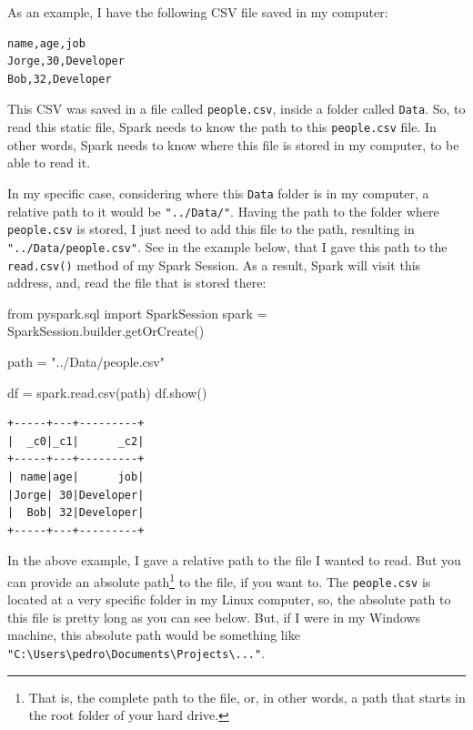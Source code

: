\documentclass[
  11pt,
  letterpaper,
  DIV=11,
  numbers=noendperiod]{scrreprt}
\newenvironment{Shaded}{\begin{snugshade}}{\end{snugshade}}
\newcommand{\ImportTok}[1]{\textcolor[rgb]{0.00,0.46,0.62}{#1}}
\newcommand{\NormalTok}[1]{\textcolor[rgb]{0.00,0.23,0.31}{#1}}
\newcommand{\OperatorTok}[1]{\textcolor[rgb]{0.37,0.37,0.37}{#1}}
\newcommand{\StringTok}[1]{\textcolor[rgb]{0.13,0.47,0.30}{#1}}
\begin{document}
As an example, I have the following CSV file saved in my computer:

\begin{verbatim}
name,age,job
Jorge,30,Developer
Bob,32,Developer
\end{verbatim}

This CSV was saved in a file called \texttt{people.csv}, inside a folder
called \texttt{Data}. So, to read this static file, Spark needs to know
the path to this \texttt{people.csv} file. In other words, Spark needs
to know where this file is stored in my computer, to be able to read it.

In my specific case, considering where this \texttt{Data} folder is in
my computer, a relative path to it would be \texttt{"../Data/"}. Having
the path to the folder where \texttt{people.csv} is stored, I just need
to add this file to the path, resulting in
\texttt{"../Data/people.csv"}. See in the example below, that I gave
this path to the \texttt{read.csv()} method of my Spark Session. As a
result, Spark will visit this address, and, read the file that is stored
there:

\begin{Shaded}
\begin{Highlighting}[]
\ImportTok{from}\NormalTok{ pyspark.sql }\ImportTok{import}\NormalTok{ SparkSession}
\NormalTok{spark }\OperatorTok{=}\NormalTok{ SparkSession.builder.getOrCreate()}

\NormalTok{path }\OperatorTok{=} \StringTok{"../Data/people.csv"}

\NormalTok{df }\OperatorTok{=}\NormalTok{ spark.read.csv(path)}
\NormalTok{df.show()}
\end{Highlighting}
\end{Shaded}

\begin{verbatim}
+-----+---+---------+
|  _c0|_c1|      _c2|
+-----+---+---------+
| name|age|      job|
|Jorge| 30|Developer|
|  Bob| 32|Developer|
+-----+---+---------+
\end{verbatim}

In the above example, I gave a relative path to the file I wanted to
read. But you can provide an absolute path\footnote{That is, the
  complete path to the file, or, in other words, a path that starts in
  the root folder of your hard drive.} to the file, if you want to. The
\texttt{people.csv} is located at a very specific folder in my Linux
computer, so, the absolute path to this file is pretty long as you can
see below. But, if I were in my Windows machine, this absolute path
would be something like
\texttt{"C:\textbackslash{}Users\textbackslash{}pedro\textbackslash{}Documents\textbackslash{}Projects\textbackslash{}..."}.
\end{document}
